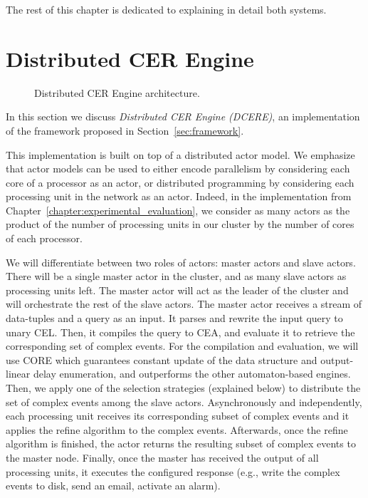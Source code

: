 The rest of this chapter is dedicated to explaining in detail both systems.

\section{Distributed CER Engine}\label{sec:dcere}

\begin{figure}[H]
  \centering
  \caption{Distributed CER Engine architecture.}
  \label{fig:dcere}
\end{figure}

In this section we discuss \emph{Distributed CER Engine (DCERE)}, an implementation of the framework proposed in Section~\ref{sec:framework}.

This implementation is built on top of a distributed actor model. We emphasize that actor models can be used to either encode parallelism by considering each core of a processor as an actor, or distributed programming by considering each processing unit in the network as an actor. Indeed, in the implementation from Chapter~\ref{chapter:experimental_evaluation}, we consider as many actors as the product of the number of processing units in our cluster by the number of cores of each processor.

We will differentiate between two roles of actors: master actors and slave actors. There will be a single master actor in the cluster, and as many slave actors as processing units left. The master actor will act as the leader of the cluster and will orchestrate the rest of the slave actors. The master actor receives a stream of data-tuples and a query as an input. It parses and rewrite the input query to unary CEL. Then, it compiles the query to CEA, and evaluate it to retrieve the corresponding set of complex events. For the compilation and evaluation, we will use CORE \cite{core} which guarantees constant update of the data structure and output-linear delay enumeration, and outperforms the other automaton-based engines. Then, we apply one of the selection strategies (explained below) to distribute the set of complex events among the slave actors. Asynchronously and independently, each processing unit receives its corresponding subset of complex events and it applies the refine algorithm to the complex events. Afterwards, once the refine algorithm is finished, the actor returns the resulting subset of complex events to the master node. Finally, once the master has received the output of all processing units, it executes the configured response (e.g., write the complex events to disk, send an email, activate an alarm).

